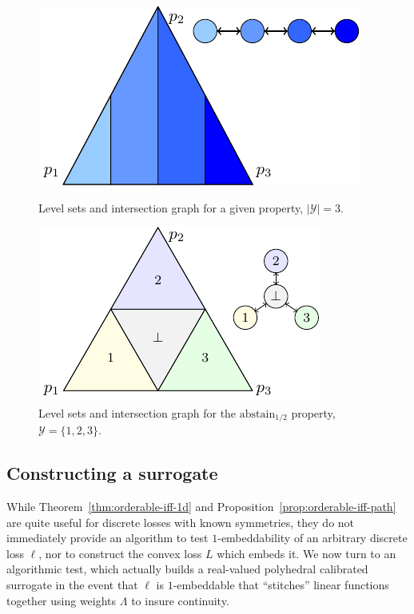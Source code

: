 \documentclass[final]{colt2020} %
\newcommand{\reals}{\mathbb{R}}
\newcommand{\nonnegreals}{\reals_{\geq 0}}%
\newcommand{\abstain}[1]{\mathrm{abstain}_{#1}}
\newcommand{\R}{\mathcal{R}}
\newcommand{\Y}{\mathcal{Y}}
\begin{document}
\begin{figure}
	\begin{minipage}{0.48\linewidth}
	\centering
	\includegraphics[width = 0.6\linewidth]{tikz/intersection-graph.pdf}
	\caption{Level sets and intersection graph for a given property, $|\Y| = 3$.}
	\label{fig:intersection-graph-ex}
	\end{minipage}
\hfill
	\begin{minipage}{0.48\linewidth}
	\centering
	\includegraphics[width = 0.6\linewidth]{tikz/abstain-alpha-half.pdf}
	\caption{Level sets and intersection graph for the $\abstain{1/2}$ property, $\Y = \{1,2,3\}$.}
	\label{fig:abstain-alpha-half}
\end{minipage}
\end{figure}

\subsection{Constructing a surrogate}
While Theorem~\ref{thm:orderable-iff-1d} and Proposition~\ref{prop:orderable-iff-path} are quite useful for discrete losses with known symmetries, they do not immediately provide an algorithm to test $1$-embeddability of an arbitrary discrete loss $\ell$, nor to construct the convex loss $L$ which embeds it.
We now turn to an algorithmic test, which actually builds a real-valued polyhedral calibrated surrogate in the event that $\ell$ is $1$-embeddable that ``stitches'' linear functions together using weights $\Lambda$ to insure continuity.

\end{document}
